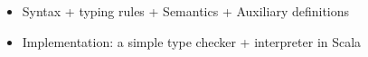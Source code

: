 \begin{comment}
\subsubsection{\collectMethods}
\[ \collectMethods(I) = \left( \bigcup_{I_i \in \overline{I}} \methods(I_i) \right) \bigcup \methods(I) \]
\[ \methods(I) = \overline{M}, \text{where } IT(I) = \interface{I}{I}{M} \]
\end{comment}

\begin{itemize}
	\item Syntax + typing rules + Semantics + Auxiliary definitions
	\item Implementation: a simple type checker + interpreter in Scala
\end{itemize}

